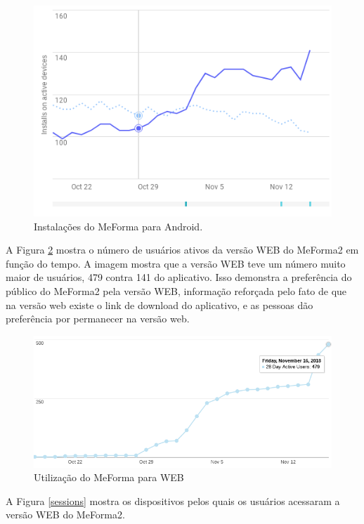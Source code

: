 \begin{figure}[H]
	   \centering
	   		\includegraphics[scale=0.85]{pics/c5/5-installs.png}
	   \caption{Instalações do MeForma para Android.}
	   \label{installs}
\end{figure}

A Figura \ref{web} mostra o número de usuários ativos da versão WEB do MeForma2 em função do tempo. A imagem mostra que a versão WEB teve um número muito maior de usuários, 479 contra 141 do aplicativo. Isso demonstra a preferência do público do MeForma2 pela versão WEB, informação reforçada pelo fato de que na versão web existe o link de download do aplicativo, e as pessoas dão preferência por permanecer na versão web.

\begin{figure}[H]
	   \centering
	   		\includegraphics[scale=0.65]{pics/c5/6-active.png}
	   \caption{Utilização do MeForma para WEB}
	   \label{web}
\end{figure}

A Figura \ref{sessions} mostra os dispositivos pelos quais os usuários acessaram a versão WEB do MeForma2.

